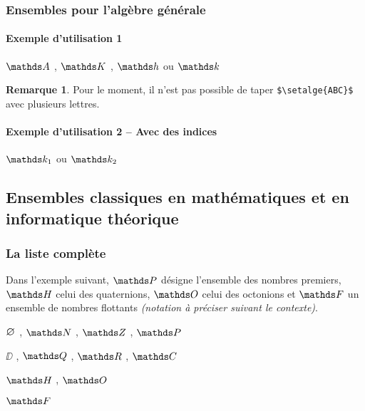 \documentclass[12pt,a4paper]{article}
\theoremstyle{definition}
\newtheorem*{remark}{Remarque}
\begin{document}


\subsubsection{Ensembles pour l'algèbre générale}

\paragraph{Exemple d'utilisation 1}

\begin{latexex}
$\setalge{A}$ ,
$\setalge{K}$ ,
$\setalge{h}$ ou
$\setalge{k}$
\end{latexex}

\begin{remark}
	Pour le moment, il n'est pas possible de taper \verb+$\setalge{ABC}$+ avec plusieurs lettres.
\end{remark}




\paragraph{Exemple d'utilisation 2 -- Avec des indices}

\begin{latexex}
$\setalge*{k}{1}$ ou $\setalge*{k}{2}$
\end{latexex}




\subsection{Ensembles classiques en mathématiques et en informatique théorique} 

\subsubsection{La liste complète}

Dans l'exemple suivant,
$\PP$ désigne l'ensemble des nombres premiers,
$\HH$ celui des quaternions,
$\OO$ celui des octonions et
$\FF$ un ensemble de nombres flottants \emph{(notation à préciser suivant le contexte)}.

\begin{latexex}
$\nullset$ , $\NN$ , $\ZZ$ , $\PP$

$\DD$ , $\QQ$ , $\RR$ , $\CC$

$\HH$ , $\OO$

$\FF$
\end{latexex}
\end{document}
